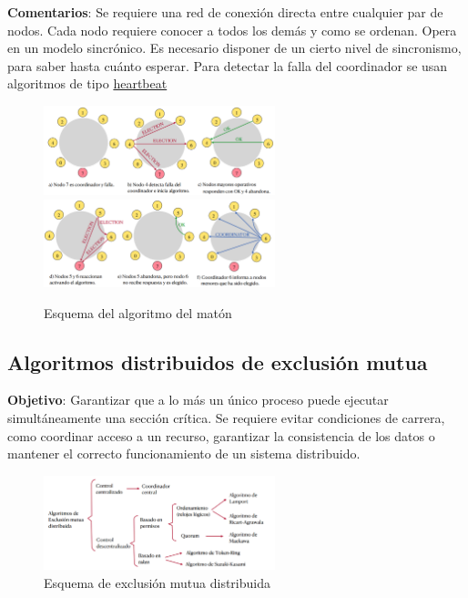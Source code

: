 \textbf{Comentarios}: Se requiere una red de conexión directa entre cualquier par de nodos. Cada nodo requiere conocer a todos los demás y como se ordenan. Opera en un modelo sincrónico. Es necesario disponer de un cierto nivel de sincronismo, para saber hasta cuánto esperar. Para detectar la falla del coordinador se usan algoritmos de tipo \underline{heartbeat}

\begin{figure}[H]
    \centering
    \includegraphics[width=0.6\textwidth]{img/Bully_1.png}
    \includegraphics[width=0.6\textwidth]{img/Bully_2.png}
    \caption{Esquema del algoritmo del matón}
    
\end{figure}

\subsection{Algoritmos distribuidos de exclusión mutua}

\textbf{Objetivo}: Garantizar que a lo más un único proceso puede ejecutar simultáneamente una sección crítica. Se requiere evitar condiciones de carrera, como coordinar acceso a un recurso, garantizar la consistencia de los datos o mantener el correcto funcionamiento de un sistema distribuido.

\begin{figure}[H]
    \centering
    \includegraphics[width=0.6\textwidth]{img/Clasificacion_algoritmos.png}
    \caption{Esquema de exclusión mutua distribuida}
\end{figure}

